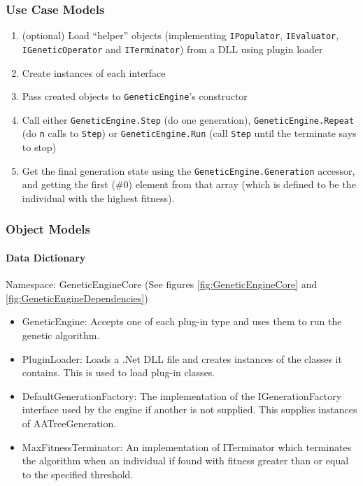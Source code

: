 \subsubsection{Use Case Models}
% 
\begin{enumerate}
 \item (optional) Load ``helper'' objects (implementing \texttt{IPopulator}, \texttt{IEvaluator}, \texttt{IGeneticOperator} and \texttt{ITerminator}) from a DLL using plugin loader
 \item Create instances of each interface
 \item Pass created objects to \texttt{GeneticEngine}'s constructor
 \item Call either \texttt{GeneticEngine.Step} (do one generation), \texttt{GeneticEngine.Repeat} (do \texttt{n} calls to \texttt{Step}) or \texttt{GeneticEngine.Run} (call \texttt{Step} until the terminate says to stop) 
 \item Get the final generation state using the \texttt{GeneticEngine.Generation} accessor, and getting the first (\#0) element from that array (which is defined to be the individual with the highest fitness).
\end{enumerate}

\subsubsection{Object Models}
\paragraph{Data Dictionary}

Namespace: GeneticEngineCore (See figures \ref{fig:GeneticEngineCore} and \ref{fig:GeneticEngineDependencies})
\begin{itemize}
\item GeneticEngine: Accepts one of each plug-in type and uses them to run the genetic algorithm.
\item PluginLoader: Loads a .Net DLL file and creates instances of the classes it contains. This is used to load plug-in classes.
\item DefaultGenerationFactory: The implementation of the IGenerationFactory interface used by the engine if another is not supplied. This supplies instances of AATreeGeneration.
\item MaxFitnessTerminator: An implementation of ITerminator which terminates the algorithm when an individual if found with fitness greater than or equal to the specified threshold.
\end{itemize}

